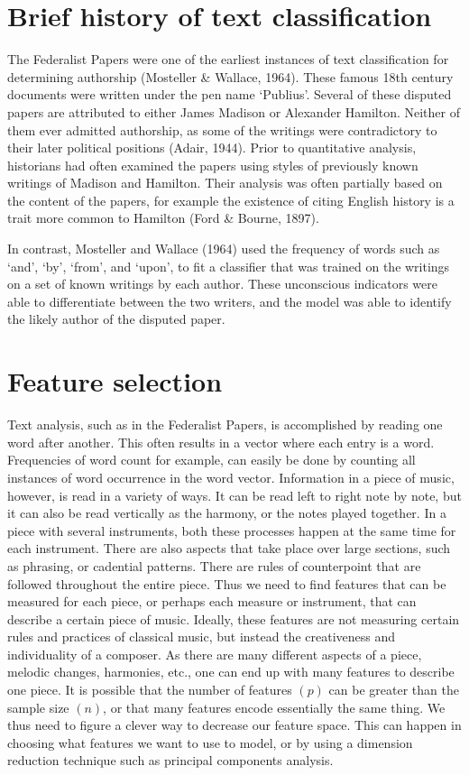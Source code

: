 \documentclass[12pt,twoside]{reedthesis}
\theoremstyle{definition}
\theoremstyle{definition}
\theoremstyle{definition}
\theoremstyle{remark}
\begin{document}
\section{Brief history of text
classification}\label{brief-history-of-text-classification}

The Federalist Papers were one of the earliest instances of text
classification for determining authorship (Mosteller \& Wallace, 1964).
These famous 18th century documents were written under the pen name
`Publius'. Several of these disputed papers are attributed to either
James Madison or Alexander Hamilton. Neither of them ever admitted
authorship, as some of the writings were contradictory to their later
political positions (Adair, 1944). Prior to quantitative analysis,
historians had often examined the papers using styles of previously
known writings of Madison and Hamilton. Their analysis was often
partially based on the content of the papers, for example the existence
of citing English history is a trait more common to Hamilton (Ford \&
Bourne, 1897).

In contrast, Mosteller and Wallace (1964) used the frequency of words
such as `and', `by', `from', and `upon', to fit a classifier that was
trained on the writings on a set of known writings by each author. These
unconscious indicators were able to differentiate between the two
writers, and the model was able to identify the likely author of the
disputed paper.

\section{Feature selection}\label{feature-selection}

Text analysis, such as in the Federalist Papers, is accomplished by
reading one word after another. This often results in a vector where
each entry is a word. Frequencies of word count for example, can easily
be done by counting all instances of word occurrence in the word vector.
Information in a piece of music, however, is read in a variety of ways.
It can be read left to right note by note, but it can also be read
vertically as the harmony, or the notes played together. In a piece with
several instruments, both these processes happen at the same time for
each instrument. There are also aspects that take place over large
sections, such as phrasing, or cadential patterns. There are rules of
counterpoint that are followed throughout the entire piece. Thus we need
to find features that can be measured for each piece, or perhaps each
measure or instrument, that can describe a certain piece of music.
Ideally, these features are not measuring certain rules and practices of
classical music, but instead the creativeness and individuality of a
composer. As there are many different aspects of a piece, melodic
changes, harmonies, etc., one can end up with many features to describe
one piece. It is possible that the number of features \((p)\) can be
greater than the sample size \((n)\), or that many features encode
essentially the same thing. We thus need to figure a clever way to
decrease our feature space. This can happen in choosing what features we
want to use to model, or by using a dimension reduction technique such
as principal components analysis.
\end{document}
